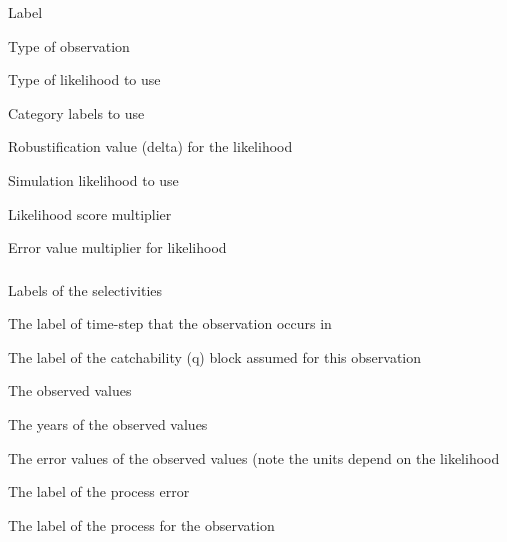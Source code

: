 
 {Label}

 {Type of observation}

 {Type of likelihood to use}

 {Category labels to use}

 {Robustification value (delta) for the likelihood}

 {Simulation likelihood to use}

 {Likelihood score multiplier}

 {Error value multiplier for likelihood}

\subsubsection[Process Abundance]{}

 {Labels of the selectivities}

 {The label of time-step that the observation occurs in}

 {The label of the catchability (q) block assumed for this observation}

 {The observed values}

 {The years of the observed values}

 {The error values of the observed values (note the units depend on the likelihood}

 {The label of the process error}

 {The label of the process for the observation}

